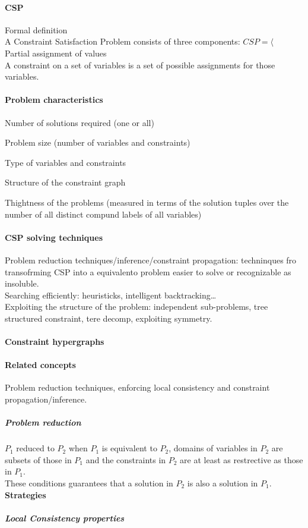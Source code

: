 \documentclass[10pt]{report}
\begin{document}
\paragraph{CSP} Formal definition\\
A Constraint Satisfaction Problem consists of three components: $CSP = \langle$\\ %
Partial assignment of values\\
A constraint on a set of variables is a set of possible assignments for those variables.\\
\paragraph{Problem characteristics} \begin{list}{}{}
	\item Number of solutions required (one or all)
	\item Problem size (number of variables and constraints)
	\item Type of variables and constraints
	\item Structure of the constraint graph
	\item Thightness of the problems (measured in terms of the solution tuples over the number of all distinct compund labels of all variables)
\end{list}
\paragraph{CSP solving techniques} Problem reduction techniques/inference/constraint propagation: techninques fro transofrming CSP into a equivalento problem easier to solve or recognizable as insoluble.\\
Searching efficiently: heuristicks, intelligent backtracking\ldots\\
Exploiting the structure of the problem: independent sub-problems, tree structured constraint, tere decomp, exploiting symmetry.
\paragraph{Constraint hypergraphs}
\paragraph{Related concepts} Problem reduction techniques, enforcing local consistency and constraint propagation/inference.
\subparagraph{Problem reduction} $P_1$ reduced to $P_2$ when $P_1$ is equivalent to $P_2$, domains of variables in $P_2$ are subsets of those in $P_1$ and the constraints in $P_2$ are at least as restrective as those in $P_1$.\\
These conditions guarantees that a solution in $P_2$ is also a solution in $P_1$.\\
\textbf{Strategies}
\subparagraph{Local Consistency properties}
\end{document}
